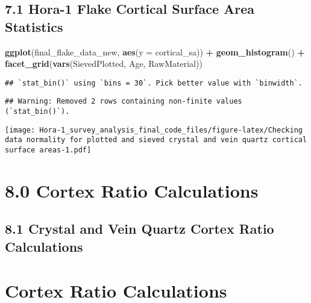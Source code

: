 \documentclass[
]{article}
\newenvironment{Shaded}{\begin{snugshade}}{\end{snugshade}}
\newcommand{\AttributeTok}[1]{\textcolor[rgb]{0.13,0.29,0.53}{#1}}
\newcommand{\FunctionTok}[1]{\textcolor[rgb]{0.13,0.29,0.53}{\textbf{#1}}}
\newcommand{\NormalTok}[1]{#1}
\newcommand{\SpecialCharTok}[1]{\textcolor[rgb]{0.81,0.36,0.00}{\textbf{#1}}}
\begin{document}
\hypertarget{hora-1-flake-cortical-surface-area-statistics}{%
\subsection{7.1 Hora-1 Flake Cortical Surface Area
Statistics}\label{hora-1-flake-cortical-surface-area-statistics}}

\begin{Shaded}
\begin{Highlighting}[]
\FunctionTok{ggplot}\NormalTok{(final\_flake\_data\_new, }\FunctionTok{aes}\NormalTok{(}\AttributeTok{y =}\NormalTok{ cortical\_sa)) }\SpecialCharTok{+}
  \FunctionTok{geom\_histogram}\NormalTok{() }\SpecialCharTok{+}
  \FunctionTok{facet\_grid}\NormalTok{(}\FunctionTok{vars}\NormalTok{(SievedPlotted, Age, RawMaterial))}
\end{Highlighting}
\end{Shaded}

\begin{verbatim}
## `stat_bin()` using `bins = 30`. Pick better value with `binwidth`.
\end{verbatim}

\begin{verbatim}
## Warning: Removed 2 rows containing non-finite values (`stat_bin()`).
\end{verbatim}

\texttt{[image: Hora-1\_survey\_analysis\_final\_code\_files/figure-latex/Checking data normality for plotted and sieved crystal and vein quartz cortical surface areas-1.pdf]}

\hypertarget{cortex-ratio-calculations}{%
\section{8.0 Cortex Ratio
Calculations}\label{cortex-ratio-calculations}}

\hypertarget{crystal-and-vein-quartz-cortex-ratio-calculations}{%
\subsection{8.1 Crystal and Vein Quartz Cortex Ratio
Calculations}\label{crystal-and-vein-quartz-cortex-ratio-calculations}}

\hypertarget{cortex-ratio-calculations-1}{%
\section{Cortex Ratio Calculations}\label{cortex-ratio-calculations-1}}
\end{document}
